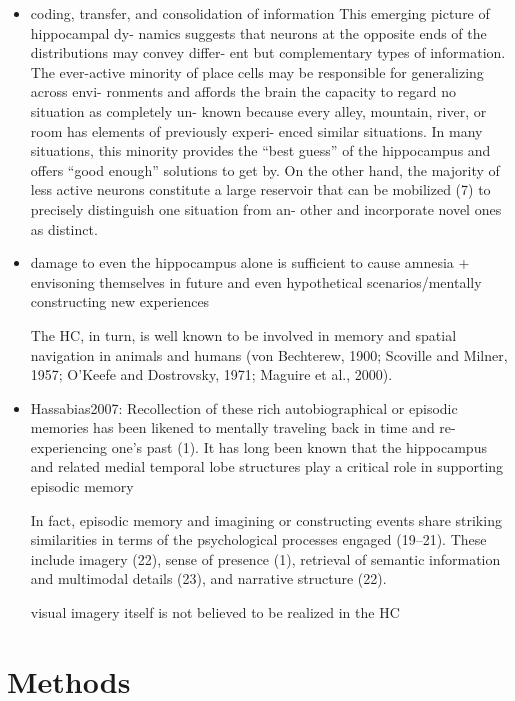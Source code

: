 \documentclass{article} %
\begin{document}
\begin{itemize}
\begin{itemize}
\item
coding, transfer, and consolidation of
information
This emerging picture of hippocampal dy- namics suggests that neurons at the opposite ends of the distributions may convey differ- ent but complementary types of information. The ever-active minority of place cells may be responsible for generalizing across envi- ronments and affords the brain the capacity to regard no situation as completely un- known because every alley, mountain, river, or room has elements of previously experi- enced similar situations. In many situations,
this minority provides the “best guess” of the hippocampus and offers “good enough” solutions to get by. On the other hand, the majority of less active neurons constitute a large reservoir that can be mobilized (7) to precisely distinguish one situation from an- other and incorporate novel ones as distinct.


\item
damage to even the hippocampus alone is sufficient to cause amnesia +
envisoning themselves in future and even hypothetical scenarios/mentally constructing new experiences

The HC, in turn, is well known to be involved in memory and spatial navigation in animals and humans (von Bechterew, 1900; Scoville and Milner, 1957; O’Keefe and Dostrovsky, 1971; Maguire et al., 2000). 

\item
Hassabias2007:
Recollection of these rich autobiographical or episodic memories has been likened to mentally traveling back in time and re-experiencing one’s past (1). It has long been known that the hippocampus and related medial temporal lobe structures play a critical role in supporting episodic memory

In fact, episodic memory and imagining or constructing events share striking similarities in terms of the psychological processes engaged (19–21). These include imagery (22), sense of presence (1), retrieval of semantic information and multimodal details (23), and narrative structure (22).

visual imagery itself is not believed to be realized in the HC

  \end{itemize}
\end{itemize}




\section{Methods}
\end{document}
